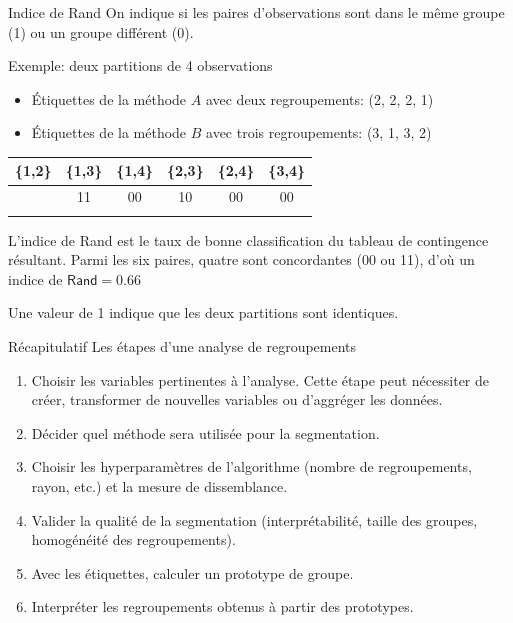 \documentclass[
  ignorenonframetext,
]{beamer}
\providecommand{\tightlist}{%
  \setlength{\itemsep}{0pt}\setlength{\parskip}{0pt}}\usepackage{longtable,booktabs,array}
\begin{document}
\begin{frame}{Indice de Rand}
\protect\hypertarget{indice-de-rand}{}
On indique si les paires d'observations sont dans le même groupe (1) ou
un groupe différent (0).

Exemple: deux partitions de 4 observations

\begin{itemize}
\tightlist
\item
  Étiquettes de la méthode \(A\) avec deux regroupements: (2, 2, 2, 1)
\item
  Étiquettes de la méthode \(B\) avec trois regroupements: (3, 1, 3, 2)
\end{itemize}

\begin{longtable}[]{@{}cccccc@{}}
\toprule\noalign{}
\{1,2\} & \{1,3\} & \{1,4\} & \{2,3\} & \{2,4\} & \{3,4\} \\
\midrule\noalign{}
\endhead
10 & 11 & 00 & 10 & 00 & 00 \\
\bottomrule\noalign{}
\end{longtable}

L'indice de Rand est le taux de bonne classification du tableau de
contingence résultant. Parmi les six paires, quatre sont concordantes
(00 ou 11), d'où un indice de \(\textsf{Rand} = 0.66\)

Une valeur de 1 indique que les deux partitions sont identiques.
\end{frame}

\begin{frame}{Récapitulatif}
\protect\hypertarget{ruxe9capitulatif}{}
Les étapes d'une analyse de regroupements

\begin{enumerate}
\tightlist
\item
  Choisir les variables pertinentes à l'analyse. Cette étape peut
  nécessiter de créer, transformer de nouvelles variables ou d'aggréger
  les données.
\item
  Décider quel méthode sera utilisée pour la segmentation.
\item
  Choisir les hyperparamètres de l'algorithme (nombre de regroupements,
  rayon, etc.) et la mesure de dissemblance.
\item
  Valider la qualité de la segmentation (interprétabilité, taille des
  groupes, homogénéité des regroupements).
\item
  Avec les étiquettes, calculer un prototype de groupe.
\item
  Interpréter les regroupements obtenus à partir des prototypes.
\end{enumerate}
\end{frame}
\end{document}
